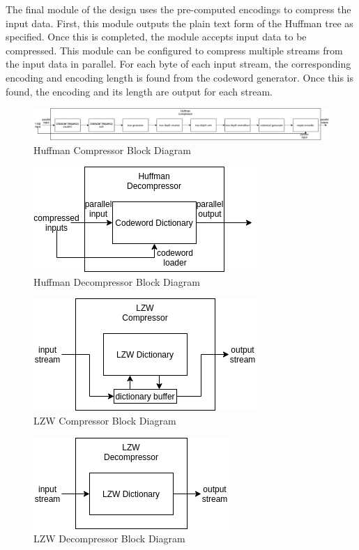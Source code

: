 \documentclass[doublespace,nopageskip]{VTthesis}
\begin{document}
The final module of the design uses the pre-computed encodings to compress the input data. First, this module outputs the plain text form of the Huffman tree as specified. Once this is completed, the module accepts input data to be compressed. This module can be configured to compress multiple streams from the input data in parallel. For each byte of each input stream, the corresponding encoding and encoding length is found from the codeword generator. Once this is found, the encoding and its length are output for each stream.

\begin{figure}[htb]
	\centering
	\includegraphics[scale=0.33]{Huffman Compressor Block Diagram.png}
	\caption{Huffman Compressor Block Diagram}
	\label{fig:huffman_compressor_block_diagram}
\end{figure}

\begin{figure}[htb]
	\centering
	\includegraphics[scale=1]{Huffman Decompressor Block Diagram.png}
	\caption{Huffman Decompressor Block Diagram}
	\label{fig:huffman_decompressor_block_diagram}
\end{figure}

\begin{figure}[htb]
	\centering
	\includegraphics[scale=1]{LZW Compressor.png}
	\caption{LZW Compressor Block Diagram}
	\label{fig:lzw_compressor_block_diagram}
\end{figure}

\begin{figure}[htb]
	\centering
	\includegraphics[scale=1]{LZW Decompressor.png}
	\caption{LZW Decompressor Block Diagram}
	\label{fig:lzw_decompressor_block_diagram}
\end{figure}
\end{document}
